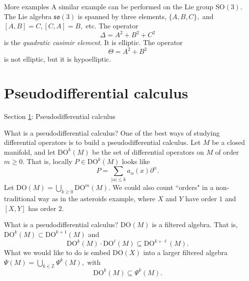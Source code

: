 \documentclass{beamer}
\numberwithin{equation}{section}
\theoremstyle{plain}
\theoremstyle{plain}
\theoremstyle{definition}
\theoremstyle{plain}
\theoremstyle{plain}
\theoremstyle{definition}
\newcommand{\Rl}{\mathbb{R}}
\newcommand{\Itgr}{\mathbb{Z}}
\begin{document}
\begin{frame}{More examples}
  A similar example can be performed on the Lie group $\mathrm{SO}(3).$ The Lie algebra $\mathfrak{so}(3)$
  is spanned by three elements, $\{A,B,C\},$ and $[A,B]=C, [C,A] = B,$ etc.
  \pause
  The operator
  \[
      \Delta = A^2+B^2+C^2
  \]
  is the \emph{quadratic casimir element}. It is elliptic.
  \pause
  The operator
  \[
    \Theta = A^2+B^2
  \]
  is not elliptic, but it is hypoelliptic.
\end{frame}
% 
% 



\section{Pseudodifferential calculus}\label{psido_section}

\begin{frame}
    \huge{Section \ref{psido_section}: Pseudodifferential calculus}
\end{frame}

\begin{frame}{What is a pseudodifferential calculus?}
  One of the best ways of studying differential operators is to build a pseudodifferential calculus.
  \pause
  Let $M$ be a closed manifold, and let $\mathrm{DO}^k(M)$ be the set of differential operators on $M$
  of order $m\geq 0.$ That is, locally $P \in \mathrm{DO}^k(M)$ looks like
  \[
    P = \sum_{|\alpha|\leq k} a_{\alpha}(x)\partial^{\alpha}.
  \]
  Let $\mathrm{DO}(M) = \bigcup_{k\geq 0} \mathrm{DO}^m(M).$
  \pause
  We could also count ``orders" in a non-traditional way as in the asteroids example, where $X$ and $Y$ have order $1$ and $[X,Y]$ has order $2.$
\end{frame}

\begin{frame}{What is a pseudodifferential calculus?}
  $\mathrm{DO}(M)$ is a filtered algebra. That is, $\mathrm{DO}^{k}(M)\subset \mathrm{DO}^{k+1}(M)$ and
  \[
    \mathrm{DO}^k(M)\cdot \mathrm{DO}^\ell(M) \subseteq \mathrm{DO}^{k+\ell}(M).
  \]
  What we would like to do is embed $\mathrm{DO}(X)$ into a larger filtered algebra $\Psi(M)=\bigcup_{k\in \Itgr} \Psi^k(M),$ with
  \[
    \mathrm{DO}^k(M) \subseteq \Psi^k(M).
  \]
\end{frame}
\end{document}
